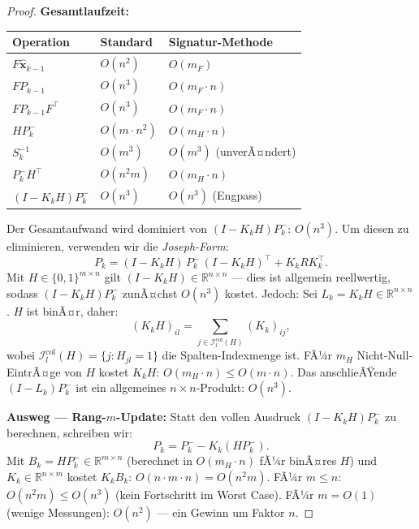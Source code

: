 ﻿\documentclass[a4paper,12pt]{article}
\theoremstyle{definition}
\begin{document}
\begin{proof}
\medskip
\textbf{Gesamtlaufzeit:}

\begin{center}
\begin{tabular}{lll}
\toprule
Operation & Standard & Signatur-Methode \\
\midrule
$F\hat{\mathbf{x}}_{k-1}$ & $O(n^2)$ & $O(m_F)$ \\
$FP_{k-1}$ & $O(n^3)$ & $O(m_F \cdot n)$ \\
$FP_{k-1}F^\top$ & $O(n^3)$ & $O(m_F \cdot n)$ \\
$HP_k^-$ & $O(m \cdot n^2)$ & $O(m_H \cdot n)$ \\
$S_k^{-1}$ & $O(m^3)$ & $O(m^3)$ (unverÃ¤ndert) \\
$P_k^- H^\top$ & $O(n^2 m)$ & $O(m_H \cdot n)$ \\
$(I-K_kH)P_k^-$ & $O(n^3)$ & $O(n^3)$ (Engpass) \\
\bottomrule
\end{tabular}
\end{center}

Der Gesamtaufwand wird dominiert von $(I - K_k H)P_k^-$: $O(n^3)$.
Um diesen zu eliminieren, verwenden wir die \emph{Joseph-Form}:
\[
    P_k = (I - K_k H)\,P_k^-\,(I-K_kH)^\top + K_k R K_k^\top.
\]
Mit $H \in \{0,1\}^{m\times n}$ gilt $(I - K_k H) \in \mathbb{R}^{n\times n}$ ---
dies ist allgemein reellwertig, sodass $(I-K_kH)P_k^-$ zunÃ¤chst $O(n^3)$ kostet.
Jedoch: Sei $L_k = K_k H \in \mathbb{R}^{n\times n}$.
$H$ ist binÃ¤r, daher:
\[
    (K_k H)_{il} = \sum_{j \in \mathcal{I}_l^{\text{col}}(H)} (K_k)_{ij},
\]
wobei $\mathcal{I}_l^{\text{col}}(H) = \{j : H_{jl}=1\}$ die Spalten-Indexmenge ist.
FÃ¼r $m_H$ Nicht-Null-EintrÃ¤ge von $H$ kostet $K_k H$:
$O(m_H \cdot n) \leq O(m \cdot n)$.
Das anschlieÃŸende $(I - L_k)P_k^-$ ist ein allgemeines $n\times n$-Produkt: $O(n^3)$.

\medskip
\textbf{Ausweg --- Rang-$m$-Update:}
Statt den vollen Ausdruck $(I - K_k H)P_k^-$ zu berechnen, schreiben wir:
\[
    P_k = P_k^- - K_k(HP_k^-).
\]
Mit $B_k = HP_k^- \in \mathbb{R}^{m\times n}$ (berechnet in $O(m_H \cdot n)$ fÃ¼r
binÃ¤res $H$) und $K_k \in \mathbb{R}^{n\times m}$ kostet $K_k B_k$:
$O(n \cdot m \cdot n) = O(n^2 m)$.
FÃ¼r $m \leq n$: $O(n^2 m) \leq O(n^3)$ (kein Fortschritt im Worst Case).
FÃ¼r $m = O(1)$ (wenige Messungen): $O(n^2)$ --- ein Gewinn um Faktor $n$.


\end{proof}
\end{document}

